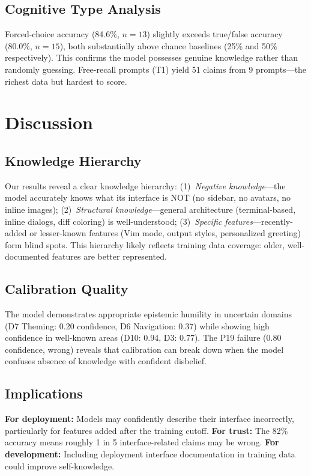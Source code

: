 \documentclass[10pt,twocolumn]{article}
\begin{document}
\subsection{Cognitive Type Analysis}

Forced-choice accuracy (84.6\%, $n{=}13$) slightly exceeds true/false accuracy (80.0\%, $n{=}15$), both substantially above chance baselines (25\% and 50\% respectively).
This confirms the model possesses genuine knowledge rather than randomly guessing.
Free-recall prompts (T1) yield 51 claims from 9 prompts---the richest data but hardest to score.

\section{Discussion}

\subsection{Knowledge Hierarchy}
Our results reveal a clear knowledge hierarchy:
(1)~\textit{Negative knowledge}---the model accurately knows what its interface is NOT (no sidebar, no avatars, no inline images);
(2)~\textit{Structural knowledge}---general architecture (terminal-based, inline dialogs, diff coloring) is well-understood;
(3)~\textit{Specific features}---recently-added or lesser-known features (Vim mode, output styles, personalized greeting) form blind spots.
This hierarchy likely reflects training data coverage: older, well-documented features are better represented.

\subsection{Calibration Quality}
The model demonstrates appropriate epistemic humility in uncertain domains (D7 Theming: 0.20 confidence, D6 Navigation: 0.37) while showing high confidence in well-known areas (D10: 0.94, D3: 0.77).
The P19 failure (0.80 confidence, wrong) reveals that calibration can break down when the model confuses absence of knowledge with confident disbelief.

\subsection{Implications}
\textbf{For deployment:} Models may confidently describe their interface incorrectly, particularly for features added after the training cutoff.
\textbf{For trust:} The 82\% accuracy means roughly 1 in 5 interface-related claims may be wrong.
\textbf{For development:} Including deployment interface documentation in training data could improve self-knowledge.
\end{document}
